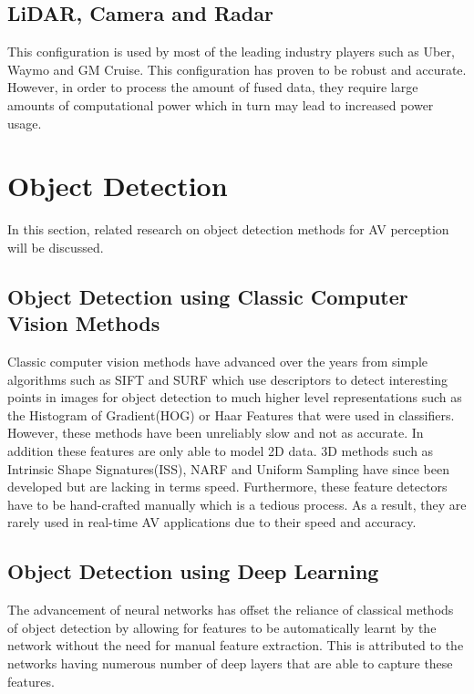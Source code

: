 \subsection{LiDAR, Camera and Radar}
This configuration is used by most of the leading industry players such as Uber, Waymo and GM Cruise. This configuration has proven to be robust and accurate. However, in order to process the amount of fused data, they require large amounts of computational power which in turn may lead to increased power usage. 


\section{Object  Detection} 
In this section, related research on object detection methods for AV perception will be discussed. 




\subsection{Object Detection using Classic Computer Vision Methods}
Classic computer vision methods have advanced over the years from simple algorithms such as SIFT\cite{lowe1999object} and SURF\cite{bay2006surf} which use descriptors to detect interesting points in images for object detection to much higher level representations such as the Histogram of Gradient(HOG)\cite{dalal2005histograms} or Haar Features\cite{viola2001rapid}  that were used in classifiers.  However, these methods have been unreliably slow and not as accurate. In addition these features are only able to model 2D data. 3D methods such as Intrinsic Shape Signatures(ISS)\cite{zhong2009intrinsic}, NARF\cite{steder2010narf} and Uniform Sampling have since been developed but are lacking in terms speed. Furthermore, these feature detectors have to be hand-crafted manually which is a tedious process. As a result, they are rarely used in real-time AV applications due to their speed and accuracy.


\subsection{Object Detection using Deep Learning}
The advancement of neural networks has offset the reliance of classical methods of object detection by allowing for features to be automatically learnt by the network without the need for manual feature extraction. This is attributed to the networks having numerous number of deep layers that are able to capture these features.  
